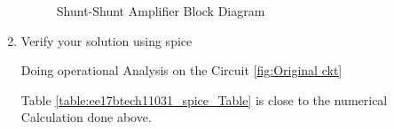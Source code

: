 \begin{enumerate}[label=\thesection.\arabic*.,ref=\thesection.\theenumi]
\begin{table}[!ht]
\centering

\caption{}
\label{table:ee17btech11031_value_Table}
\end{table}

 \begin{figure}[!ht]
 	\begin{center}
 			\resizebox{\columnwidth}{!}{}
 	\end{center}
 \caption{Shunt-Shunt Amplifier Block Diagram}
 \label{fig: ss2 ckt}
 \end{figure}

\item Verify your solution using spice

\solution Doing operational Analysis on the Circuit \ref{fig:Original ckt}

\begin{table}[!ht]
\centering

\caption{}
\label{table:ee17btech11031_spice_Table}
\end{table}

Table \ref{table:ee17btech11031_spice_Table} is close to the numerical Calculation done above.

 \end{enumerate}
